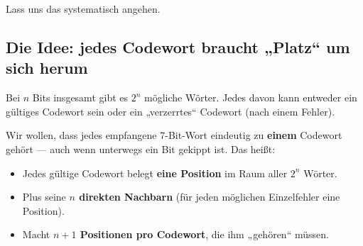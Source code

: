 Lass uns das systematisch angehen.

\subsection*{Die Idee: jedes Codewort braucht „Platz“ um sich herum}

Bei $n$ Bits insgesamt gibt es $2^n$ mögliche Wörter. Jedes davon kann
entweder ein gültiges Codewort sein oder ein „verzerrtes“ Codewort
(nach einem Fehler).

Wir wollen, dass jedes empfangene 7-Bit-Wort eindeutig zu \textbf{einem}
Codewort gehört — auch wenn unterwegs ein Bit gekippt ist. Das heißt:

\begin{itemize}
\item Jedes gültige Codewort belegt \textbf{eine Position} im Raum
  aller $2^n$ Wörter.
\item Plus seine \textbf{$n$ direkten Nachbarn} (für jeden möglichen
  Einzelfehler eine Position).
\item Macht \textbf{$n+1$ Positionen pro Codewort}, die ihm „gehören“
  müssen.
\end{itemize}

